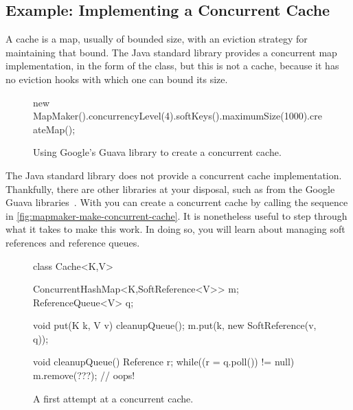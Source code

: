 \subsection{Example: Implementing a Concurrent Cache}
\label{sec:lifetime-management-concurrency-issues}

A cache is a map, usually of bounded size, with an eviction strategy for
maintaining that bound. The Java standard library provides a
concurrent map implementation, in the form of the 
class, but this is not a cache, because it has no eviction hooks with which one
can bound its size.

\begin{wrapfigure}[9]{l}{0.34\textwidth}
\centering
\vspace{-2mm}
\begin{framedlisting}
new MapMaker().concurrencyLevel(4).softKeys().maximumSize(1000).createMap();
\end{framedlisting}
\caption{Using Google's Guava library to create a concurrent cache.}
\label{fig:mapmaker-make-concurrent-cache}
\end{wrapfigure}
The Java standard library does not provide a concurrent cache implementation.
Thankfully, there are other libraries at your disposal, such as 
from the Google Guava libraries~\cite{google-guava}. With  you can create
a concurrent cache by calling the sequence in
\autoref{fig:mapmaker-make-concurrent-cache}. It is nonetheless useful to step
through what it takes to make this work. In doing so, you will learn about
managing soft references and reference queues.

\begin{wrapfigure}{r}{0.605\textwidth}
\centering
\begin{figurelisting}
class Cache<K,V> {
  ConcurrentHashMap<K,SoftReference<V>> m;
  ReferenceQueue<V> q;

  void put(K k, V v) {
    cleanupQueue();
    m.put(k, new SoftReference(v, q));
  }
  
  void cleanupQueue() {
    Reference r;
    while((r = q.poll()) != null)
       m.remove(???); // oops!
  }
}
\end{figurelisting}
\caption{A first attempt at a concurrent cache.}
\label{fig:concurrent-cache-first-attempt}
\end{wrapfigure}

